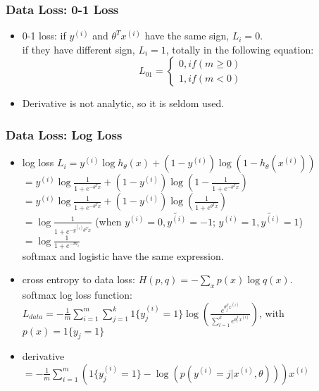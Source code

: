 \begin{frame}
\frametitle{Data Loss: 0-1 Loss}
	\small
	\begin{itemize}
		\item 0-1 loss: if $y^{(i)}$ and $\theta^Tx^{(i)}$ have the same sign, $L_i=0$.\\
			\hspace{1cm}if they have different sign, $L_i=1$, totally in the following equation:\\
				\begin{equation}
					L_{01}=
					\left\{
						\begin{aligned}
							0, if(m\geq 0)\\
							1, if(m < 0)
						\end{aligned}
					\right.
				\end{equation}
		\item Derivative is not analytic, so it is seldom used.
	\end{itemize}
\end{frame}
\begin{frame}
\frametitle{Data Loss: Log Loss}
	\small
	\begin{itemize}
		\item log loss
			$L_i=y^{(i)}\log h_{\theta}(x)+{(1-y^{(i)})}\log (1-h_{\theta}(x^{(i)}))$\\
				\hspace{1cm}$=y^{(i)}\log \frac{1}{1+e^{-\theta ^T x}}+{(1-y^{(i)})}\log (1-\frac{1}{1+e^{-\theta ^T x}})$\\
				\hspace{1cm}$=y^{(i)}\log \frac{1}{1+e^{-\theta ^T x}}+{(1-y^{(i)})}\log (\frac{1}{1+e^{\theta ^T x}})$\\
				\hspace{1cm}$=\log \frac{1}{1+e^{-\widetilde{y^{(i)}}\theta ^T x}}$
				\hspace{1cm} (when $y^{(i)}=0, \widetilde{y^{(i)}}=-1$; $y^{(i)}=1, \widetilde{y^{(i)}}=1$)	\\
				\hspace{1cm}$=\log \frac{1}{1+e^{-m_i}}$\\
				\hspace{1cm} softmax and logistic have the same expression.
		\item cross entropy to data loss: $H(p,q)=-\sum_x p(x)\log q(x)$.\\
			softmax	log loss function: 
			$L_{data}=-\frac{1}{m}\sum_{i=1}^{m}\sum_{j=1}^{k}1\{y_j^{(i)}=1\}\log({\frac{e^{\theta_j^Tx^{(i)}}}{\sum_{l=1}^{k} e^{\theta_l ^T x^{(i)}}}})$, with $p(x)=1\{y_j=1\}$ \\
		\item derivative\\
		\hspace{0cm}$=-\frac{1}{m}\sum_{i=1}^{m}
						(
							{1\{y_j^{(i)}=1\}}
								-\log (p(y^{(i)}=j|x^{(i)},\theta))
						){x^{(i)}}$\\
	\end{itemize}
\end{frame}
